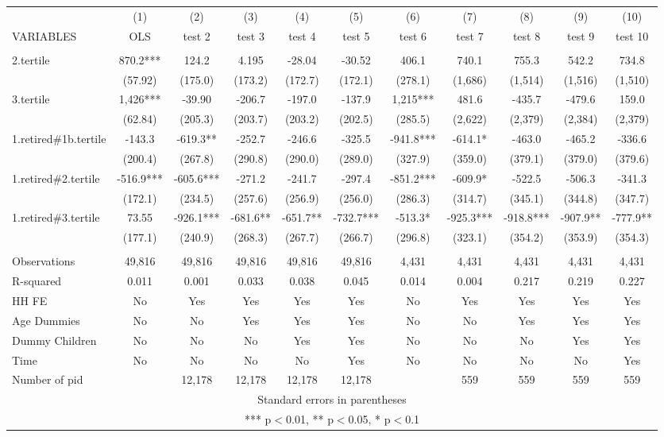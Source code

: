 \begin{tabular}{lcccccccccc} \hline
 & (1) & (2) & (3) & (4) & (5) & (6) & (7) & (8) & (9) & (10) \\
VARIABLES & OLS & test 2 & test 3 & test 4 & test 5 & test 6 & test 7 & test 8 & test 9 & test 10 \\ \hline
 &  &  &  &  &  &  &  &  &  &  \\
2.tertile & 870.2*** & 124.2 & 4.195 & -28.04 & -30.52 & 406.1 & 740.1 & 755.3 & 542.2 & 734.8 \\
 & (57.92) & (175.0) & (173.2) & (172.7) & (172.1) & (278.1) & (1,686) & (1,514) & (1,516) & (1,510) \\
3.tertile & 1,426*** & -39.90 & -206.7 & -197.0 & -137.9 & 1,215*** & 481.6 & -435.7 & -479.6 & 159.0 \\
 & (62.84) & (205.3) & (203.7) & (203.2) & (202.5) & (285.5) & (2,622) & (2,379) & (2,384) & (2,379) \\
1.retired\#1b.tertile & -143.3 & -619.3** & -252.7 & -246.6 & -325.5 & -941.8*** & -614.1* & -463.0 & -465.2 & -336.6 \\
 & (200.4) & (267.8) & (290.8) & (290.0) & (289.0) & (327.9) & (359.0) & (379.1) & (379.0) & (379.6) \\
1.retired\#2.tertile & -516.9*** & -605.6*** & -271.2 & -241.7 & -297.4 & -851.2*** & -609.9* & -522.5 & -506.3 & -341.3 \\
 & (172.1) & (234.5) & (257.6) & (256.9) & (256.0) & (286.3) & (314.7) & (345.1) & (344.8) & (347.7) \\
1.retired\#3.tertile & 73.55 & -926.1*** & -681.6** & -651.7** & -732.7*** & -513.3* & -925.3*** & -918.8*** & -907.9** & -777.9** \\
 & (177.1) & (240.9) & (268.3) & (267.7) & (266.7) & (296.8) & (323.1) & (354.2) & (353.9) & (354.3) \\
 &  &  &  &  &  &  &  &  &  &  \\
Observations & 49,816 & 49,816 & 49,816 & 49,816 & 49,816 & 4,431 & 4,431 & 4,431 & 4,431 & 4,431 \\
R-squared & 0.011 & 0.001 & 0.033 & 0.038 & 0.045 & 0.014 & 0.004 & 0.217 & 0.219 & 0.227 \\
HH FE & No & Yes & Yes & Yes & Yes & No & Yes & Yes & Yes & Yes \\
Age Dummies & No & No & Yes & Yes & Yes & No & No & Yes & Yes & Yes \\
Dummy Children & No & No & No & Yes & Yes & No & No & No & Yes & Yes \\
Time & No & No & No & No & Yes & No & No & No & No & Yes \\
 Number of pid &  & 12,178 & 12,178 & 12,178 & 12,178 &  & 559 & 559 & 559 & 559 \\ \hline
\multicolumn{11}{c}{ Standard errors in parentheses} \\
\multicolumn{11}{c}{ *** p$<$0.01, ** p$<$0.05, * p$<$0.1} \\
\end{tabular}

